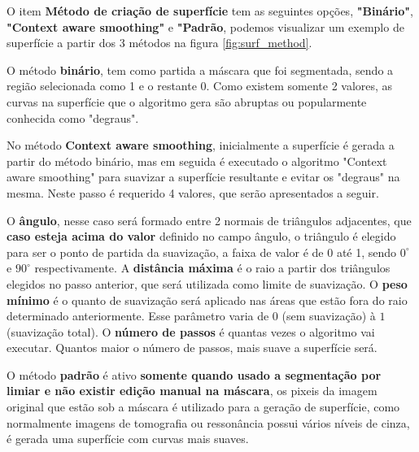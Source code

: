 O item \textbf{Método de criação de superfície} tem as seguintes opções, \textbf{"Binário"}, \textbf{"Context aware smoothing"} e \textbf{"Padrão}, podemos visualizar um exemplo de superfície a partir dos 3 métodos na figura \ref{fig:surf_method}. 

O método \textbf{binário}, tem como partida a máscara que foi segmentada, sendo a região selecionada como 1 e o restante 0. Como existem somente 2 valores, as curvas na superfície que o algoritmo gera são abruptas ou popularmente conhecida como "degraus".

No método \textbf{Context aware smoothing}, inicialmente a superfície é gerada a partir do método binário, mas em seguida é executado o algoritmo "Context aware smoothing" para suavizar a superfície resultante e evitar os "degraus" na mesma. Neste passo é requerido 4 valores, que serão apresentados a seguir.

O \textbf{ângulo}, nesse caso será formado entre 2 normais de triângulos adjacentes, que \textbf{caso esteja acima do valor} definido no campo ângulo, o triângulo é elegido para ser o ponto de partida da suavização, a faixa de valor é de 0 até 1, sendo $0^\circ$ e $90^\circ$ respectivamente. A \textbf{distância máxima} é o raio a partir dos triângulos elegidos no passo anterior, que será utilizada como limite de suavização. O \textbf{peso mínimo} é o quanto de suavização será aplicado nas áreas que estão fora do raio determinado anteriormente. Esse parâmetro varia de $0$ (sem suavização) à $1$ (suavização total). O \textbf{número de passos} é quantas vezes o algoritmo vai executar. Quantos maior o número de passos, mais suave a superfície será.

O método \textbf{padrão} é ativo \textbf{somente quando usado a segmentação por limiar e não existir edição manual na máscara}, os pixeis da imagem original que estão sob a máscara é utilizado para a geração de superfície, como normalmente imagens de tomografia ou ressonância possui vários níveis de cinza, é gerada uma superfície com curvas mais suaves.

